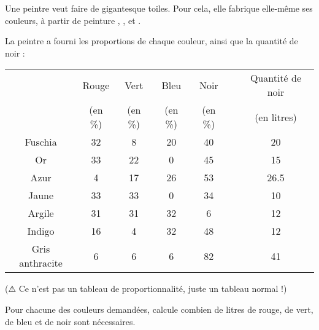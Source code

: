 \documentclass[a4paper,12pt]{article}
\begin{document}
\begin{attention}[frametitle={Exercice 2}]
	Une peintre veut faire de gigantesque toiles. Pour cela, elle fabrique elle-même ses couleurs, à partir de peinture , ,  et .

	La peintre a fourni les proportions de chaque couleur, ainsi que la quantité de noir : \vspace{1em}

	\renewcommand{\arraystretch}{1.2}
	\begin{tabular}{|c|c|c|c|c|c|c|}
		\hline
		                & Rouge   & Vert    & Bleu    & Noir    &  & Quantité de noir \\
		                & (en \%) & (en \%) & (en \%) & (en \%) &  & (en litres)      \\ \hline
		Fuschia         & 32      & 8       & 20      & 40      &  & 20               \\ \hline
		Or              & 33      & 22      & 0       & 45      &  & 15               \\ \hline
		Azur            & 4       & 17      & 26      & 53      &  & 26.5             \\ \hline
		Jaune           & 33      & 33      & 0       & 34      &  & 10               \\ \hline
		Argile          & 31      & 31      & 32      & 6       &  & 12               \\ \hline
		Indigo          & 16      & 4       & 32      & 48      &  & 12               \\ \hline
		Gris anthracite & 6       & 6       & 6       & 82      &  & 41               \\ \hline
	\end{tabular}
	\renewcommand{\arraystretch}{1}

	\begin{center}
		(⚠ Ce n'est pas un tableau de proportionnalité, juste un tableau normal !)
	\end{center}
	\vspace{0.5em}

	Pour chacune des couleurs demandées, calcule combien de litres de rouge, de vert, de bleu et de noir sont nécessaires.
\end{attention}
\end{document}
